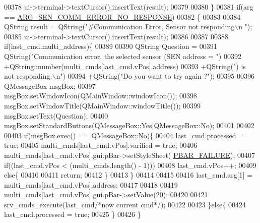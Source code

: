 \begin{DoxyCode}
{{{{{{{{{{{{{{{{00378                 ui->terminal->textCursor().insertText(result);
00379 
00380        \}
00381        \textcolor{keywordflow}{if}(arg == \hyperlink{a00034_a5f745a08fe4d5a8336a8fd62c30e0642}{ARG\_SEN\_COMM\_ERROR\_NO\_RESPONSE})
00382        \{
00383 
00384             QString result =  QString(\textcolor{stringliteral}{"#Communication Error, Sensor not responding\(\backslash\)n "});
00385             ui->terminal->textCursor().insertText(result);
00386 
00387 
00388                 \textcolor{keywordflow}{if}(last\_cmd.multi\_address)\{
00389 
00390                     QString Question =
00391                             QString(\textcolor{stringliteral}{"Communication error, the selected sensor (SEN address = "})
00392                             +QString::number(multi\_cmds[last\_cmd.vPos].address)
00393                             +QString(\textcolor{stringliteral}{") is not responding.\(\backslash\)n"})
00394                             +QString(\textcolor{stringliteral}{"Do you want to try again ?"});
00395 
00396                     QMessageBox msgBox;
00397                     msgBox.setWindowIcon(QMainWindow::windowIcon());
00398                     msgBox.setWindowTitle(QMainWindow::windowTitle());
00399                     msgBox.setText(Question);
00400                     msgBox.setStandardButtons(QMessageBox::Yes|QMessageBox::No);
00401 
00402 
00403                     \textcolor{keywordflow}{if}(msgBox.exec() == QMessageBox::No)\{
00404                     last\_cmd.processed = \textcolor{keyword}{true};
00405                     multi\_cmds[last\_cmd.vPos].varified = \textcolor{keyword}{true};
00406                     multi\_cmds[last\_cmd.vPos].gui.pBar->setStyleSheet(
      \hyperlink{a00034_aa9f43b2774395af6510910f8feed7cb4}{PBAR\_FAILURE});
00407                     \textcolor{keywordflow}{if}((last\_cmd.vPos < (multi\_cmds.length() - 1)))
00408                         last\_cmd.vPos++;
00409                     \textcolor{keywordflow}{else}\{
00410 
00411                         \textcolor{keywordflow}{return};
00412                      \}
00413                     \}
00414 
00415 
00416                     last\_cmd.arg[1] = multi\_cmds[last\_cmd.vPos].address;
00417 
00418 
00419                     multi\_cmds[last\_cmd.vPos].gui.pBar->setValue(20);
00420 
00421                     srv\_cmds\_execute(last\_cmd\textcolor{comment}{/*now current cmd*/});
00422 
00423                 \}\textcolor{keywordflow}{else}\{
00424                     last\_cmd.processed = \textcolor{keyword}{true};
00425                 \}
00426         \}
}}}}}}}}}}}}}}}}
\end{DoxyCode}
